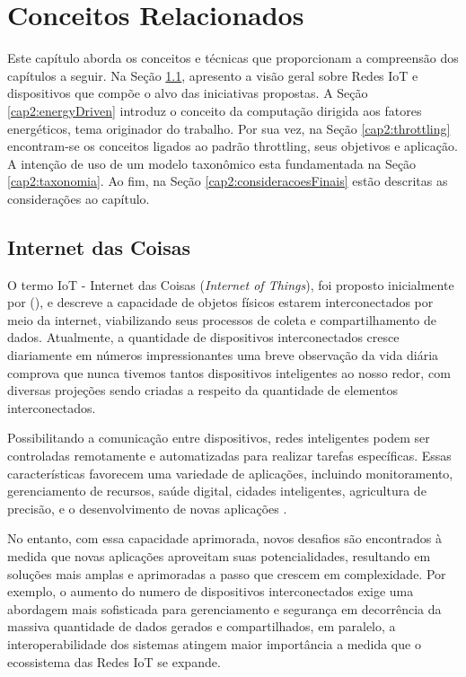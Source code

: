 \chapter{Conceitos Relacionados}
\label{cap:cap2}

Este capítulo aborda os conceitos e técnicas que proporcionam a compreensão dos capítulos a seguir. Na Seção \ref{cap2:iot}, apresento a visão geral sobre Redes IoT e dispositivos que compõe o alvo das iniciativas propostas. A Seção \ref{cap2:energyDriven} introduz o conceito da computação dirigida aos fatores energéticos, tema originador do trabalho.  Por sua vez, na Seção \ref{cap2:throttling} encontram-se os conceitos ligados ao padrão throttling, seus objetivos e aplicação. A intenção de uso de um modelo taxonômico esta fundamentada na Seção \ref{cap2:taxonomia}. Ao fim, na Seção \ref{cap2:consideracoesFinais} estão descritas as considerações ao capítulo.


\section{Internet das Coisas}
\label{cap2:iot}

O termo IoT - Internet das Coisas (\textit{Internet of Things}), foi proposto inicialmente por \citeauthor{ashton1999internet} (\citeyear{ashton1999internet}), e descreve a capacidade de objetos físicos estarem interconectados por meio da internet, viabilizando seus processos de coleta e compartilhamento de dados. Atualmente, a quantidade de dispositivos interconectados cresce diariamente em números impressionantes \cite{lund2014worldwide} uma breve observação da vida diária comprova que nunca tivemos tantos dispositivos inteligentes ao nosso redor, com diversas projeções sendo criadas a respeito da quantidade de elementos interconectados.

Possibilitando a comunicação entre dispositivos,  redes inteligentes podem ser controladas remotamente e automatizadas para realizar tarefas específicas. Essas características favorecem uma variedade de aplicações, incluindo monitoramento, gerenciamento de recursos, saúde digital, cidades inteligentes, agricultura de precisão, e o desenvolvimento de novas aplicações \cite{miorandi2012internet, asghari_internet_2019}.

No entanto, com essa capacidade aprimorada, novos desafios são encontrados à medida que novas aplicações aproveitam suas potencialidades, resultando em soluções mais amplas e aprimoradas a passo que crescem em complexidade. Por exemplo, o aumento do numero de dispositivos interconectados exige uma abordagem mais sofisticada para gerenciamento e segurança em decorrência da massiva quantidade de dados gerados e compartilhados, em paralelo, a interoperabilidade dos sistemas atingem maior importância a medida que o ecossistema das Redes IoT se expande. 

